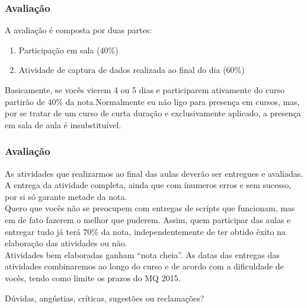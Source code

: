 \documentclass[11pt]{beamer}
\begin{document}
\begin{frame}
	\frametitle{Avaliação}
	A avaliação é composta por duas partes:
	\begin{enumerate} 
		\item Participação em sala (40\%)
		\item Atividade de captura de dados realizada ao final do dia (60\%)
	\end{enumerate}
	Basicamente, se vocês vierem 4 ou 5 dias e participarem ativamente do curso partirão de 40\% da nota.Normalmente eu não ligo para presença em cursos, mas, por se tratar de um curso de curta duração e exclusivamente aplicado, a presença em sala de aula é insubstituível. 
\end{frame}

\begin{frame}
	\frametitle{Avaliação}
	As atividades que realizarmos ao final das aulas deverão ser entregues e avaliadas. A entrega da atividade completa, ainda que com ínumeros erros e sem sucesso, por si só garante metade da nota.
	\newline\\
	Quero que vocês não se preocupem com entregas de scripts que funcionam, mas em de fato fazerem o melhor que puderem. Assim, quem participar das aulas e entregar tudo já terá 70\% da nota, independentemente de ter obtido êxito na elaboração das atividades ou não.
	\newline\\
	Atividades bem elaboradas ganham ``nota cheia''. As datas das entregas das atividades combinaremos ao longo do curso e de acordo com a dificuldade de vocês, tendo como limite os prazos do MQ 2015.
\end{frame}

\begin{frame}
	\LARGE{Dúvidas, angústias, críticas, sugestões ou reclamações?}
\end{frame}
\end{document}
